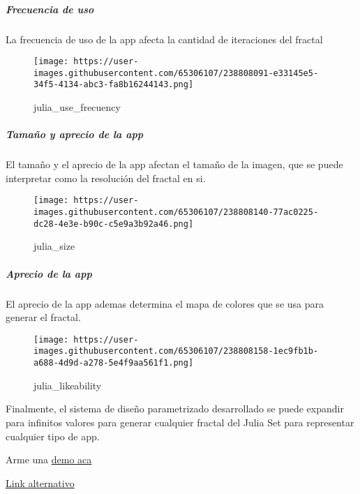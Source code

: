 \documentclass[
]{article}
\begin{document}
\hypertarget{frecuencia-de-uso}{%
\subparagraph{Frecuencia de uso}\label{frecuencia-de-uso}}

La frecuencia de uso de la app afecta la cantidad de iteraciones del
fractal

\begin{figure}
\centering
\texttt{[image: https://user-images.githubusercontent.com/65306107/238808091-e33145e5-34f5-4134-abc3-fa8b16244143.png]}
\caption{julia\_use\_frecuency}
\end{figure}

\hypertarget{tamauxf1o-y-aprecio-de-la-app}{%
\subparagraph{Tamaño y aprecio de la
app}\label{tamauxf1o-y-aprecio-de-la-app}}

El tamaño y el aprecio de la app afectan el tamaño de la imagen, que se
puede interpretar como la resolución del fractal en si.

\begin{figure}
\centering
\texttt{[image: https://user-images.githubusercontent.com/65306107/238808140-77ac0225-dc28-4e3e-b90c-c5e9a3b92a46.png]}
\caption{julia\_size}
\end{figure}

\hypertarget{aprecio-de-la-app}{%
\subparagraph{Aprecio de la app}\label{aprecio-de-la-app}}

El aprecio de la app ademas determina el mapa de colores que se usa para
generar el fractal.

\begin{figure}
\centering
\texttt{[image: https://user-images.githubusercontent.com/65306107/238808158-1ec9fb1b-a688-4d9d-a278-5e4f9aa561f1.png]}
\caption{julia\_likeability}
\end{figure}

Finalmente, el sistema de diseño parametrizado desarrollado se puede
expandir para infinitos valores para generar cualquier fractal del Julia
Set para representar cualquier tipo de app.

Arme una
\href{https://ignaciopardo-dataviz-apps-visualizer-x6avik.streamlit.app/\#demo}{demo
aca}

\href{https://datavizapps.ignaciopardo.repl.co/\#demo}{Link alternativo}
\end{document}

